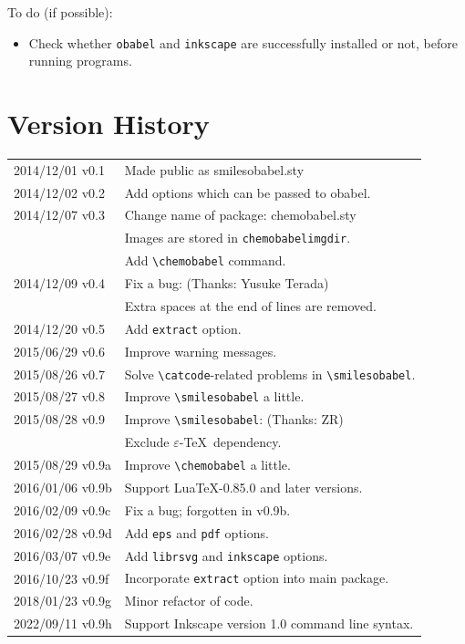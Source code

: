\documentclass[12pt]{ltjsarticle}
\begin{document}
\clearpage

To do (if possible):
\begin{itemize}
\item Check whether \texttt{obabel} and \texttt{inkscape} are successfully
installed or not, before running programs.
\end{itemize}

\section{Version History}

\begin{table}[h]
\centering
\begin{tabular}{ll}
2014/12/01 v0.1  & Made public as \textsf{smilesobabel.sty} \\
2014/12/02 v0.2  & Add options which can be passed to obabel. \\
2014/12/07 v0.3  & Change name of package: \textsf{chemobabel.sty} \\
                 & Images are stored in \texttt{chemobabelimgdir}. \\
                 & Add \verb|\chemobabel| command. \\
2014/12/09 v0.4  & Fix a bug: (Thanks: Yusuke Terada) \\
                 & Extra spaces at the end of lines are removed. \\
2014/12/20 v0.5  & Add \verb|extract| option. \\
2015/06/29 v0.6  & Improve warning messages. \\
2015/08/26 v0.7  & Solve \verb|\catcode|-related problems in \verb|\smilesobabel|. \\
2015/08/27 v0.8  & Improve \verb|\smilesobabel| a little. \\
2015/08/28 v0.9  & Improve \verb|\smilesobabel|: (Thanks: ZR) \\
                 & Exclude $\varepsilon$-\TeX\ dependency. \\
2015/08/29 v0.9a & Improve \verb|\chemobabel| a little. \\
2016/01/06 v0.9b & Support Lua\TeX-0.85.0 and later versions. \\
2016/02/09 v0.9c & Fix a bug; forgotten in v0.9b. \\
2016/02/28 v0.9d & Add \verb|eps| and \verb|pdf| options. \\
2016/03/07 v0.9e & Add \verb|librsvg| and \verb|inkscape| options. \\
2016/10/23 v0.9f & Incorporate \verb|extract| option into main package. \\
2018/01/23 v0.9g & Minor refactor of code. \\
2022/09/11 v0.9h & Support Inkscape version 1.0 command line syntax. \\
\end{tabular}
\end{table}
\end{document}
